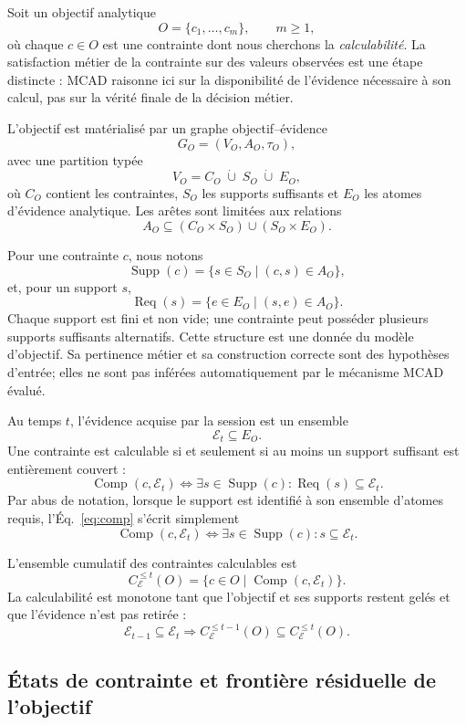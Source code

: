 \documentclass[journal]{IEEEtran}
\begin{document}
Soit un objectif analytique
\[
O=\{c_1,\ldots,c_m\},\qquad m\ge 1,
\]
où chaque $c\in O$ est une contrainte dont nous cherchons la \emph{calculabilité}. La satisfaction métier de la contrainte sur des valeurs observées est une étape distincte : MCAD raisonne ici sur la disponibilité de l'évidence nécessaire à son calcul, pas sur la vérité finale de la décision métier.

L'objectif est matérialisé par un graphe objectif--évidence
\[
G_O=(V_O,A_O,\tau_O),
\]
avec une partition typée
\[
V_O=C_O\;\dot\cup\;S_O\;\dot\cup\;E_O,
\]
où $C_O$ contient les contraintes, $S_O$ les supports suffisants et $E_O$ les atomes d'évidence analytique. Les arêtes sont limitées aux relations
\[
A_O\subseteq (C_O\times S_O)\cup(S_O\times E_O).
\]

Pour une contrainte $c$, nous notons
\[
\operatorname{Supp}(c)=\{s\in S_O\mid (c,s)\in A_O\},
\]
et, pour un support $s$,
\[
\operatorname{Req}(s)=\{e\in E_O\mid (s,e)\in A_O\}.
\]
Chaque support est fini et non vide; une contrainte peut posséder plusieurs supports suffisants alternatifs. Cette structure est une donnée du modèle d'objectif. Sa pertinence métier et sa construction correcte sont des hypothèses d'entrée; elles ne sont pas inférées automatiquement par le mécanisme MCAD évalué.

Au temps $t$, l'évidence acquise par la session est un ensemble
\[
\mathcal{E}_t\subseteq E_O.
\]
Une contrainte est calculable si et seulement si au moins un support suffisant est entièrement couvert :
\begin{equation}
\label{eq:comp}
\operatorname{Comp}(c,\mathcal{E}_t)
\Longleftrightarrow
\exists s\in\operatorname{Supp}(c):
\operatorname{Req}(s)\subseteq\mathcal{E}_t.
\end{equation}
Par abus de notation, lorsque le support est identifié à son ensemble d'atomes requis, l'Éq.~\eqref{eq:comp} s'écrit simplement
\[
\operatorname{Comp}(c,\mathcal{E}_t)
\Longleftrightarrow
\exists s\in\operatorname{Supp}(c):s\subseteq\mathcal{E}_t.
\]

L'ensemble cumulatif des contraintes calculables est
\[
C_{\mathcal{E}}^{\le t}(O)
=
\{c\in O\mid \operatorname{Comp}(c,\mathcal{E}_t)\}.
\]
La calculabilité est monotone tant que l'objectif et ses supports restent gelés et que l'évidence n'est pas retirée :
\[
\mathcal{E}_{t-1}\subseteq\mathcal{E}_t
\Longrightarrow
C_{\mathcal{E}}^{\le t-1}(O)\subseteq C_{\mathcal{E}}^{\le t}(O).
\]

\subsection{États de contrainte et frontière résiduelle de l'objectif}
\end{document}
